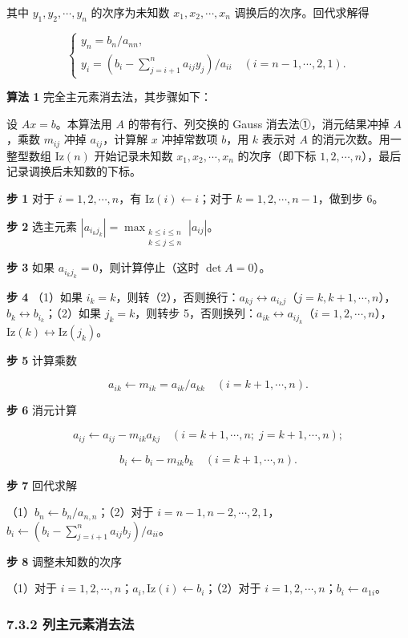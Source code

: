 \documentclass[
  10pt,
  fontset=fandol]{ctexart}
\begin{document}
其中 \(y_1,y_2,\cdots,y_n\) 的次序为未知数 \(x_1,x_2,\cdots,x_n\) 调换后的次序。回代求解得

\[
\begin{cases}
y_n=b_n/a_{nn},\\
y_i=\displaystyle\left(b_i-\sum_{j=i+1}^{n}a_{ij}y_j\right)/a_{ii}\quad(i=n-1,\cdots,2,1).
\end{cases}
\]

\textbf{算法 1} 完全主元素消去法，其步骤如下：

设 \(Ax=b\)。本算法用 \(A\) 的带有行、列交换的 Gauss 消去法①，消元结果冲掉 \(A\)，乘数 \(m_{ij}\) 冲掉 \(a_{ij}\)，计算解 \(x\) 冲掉常数项 \(b\)，用 \(k\) 表示对 \(A\) 的消元次数。用一整型数组 \(\mathrm{Iz}(n)\) 开始记录未知数 \(x_1,x_2,\cdots,x_n\) 的次序（即下标 \(1,2,\cdots,n\)），最后记录调换后未知数的下标。

\textbf{步 1} 对于 \(i=1,2,\cdots,n\)，有 \(\mathrm{Iz}(i)\leftarrow i\)；对于 \(k=1,2,\cdots,n-1\)，做到步 6。

\textbf{步 2} 选主元素 \(|a_{i_kj_k}|=\max_{\substack{k\le i\le n\\k\le j\le n}}|a_{ij}|\)。

\textbf{步 3} 如果 \(a_{i_kj_k}=0\)，则计算停止（这时 \(\det A=0\)）。

\textbf{步 4} （1）如果 \(i_k=k\)，则转（2），否则换行：\(a_{kj}\leftrightarrow a_{i_kj}\)（\(j=k,k+1,\cdots,n\)），\(b_k\leftrightarrow b_{i_k}\)；（2）如果 \(j_k=k\)，则转步 5，否则换列：\(a_{ik}\leftrightarrow a_{ij_k}\)（\(i=1,2,\cdots,n\)），\(\mathrm{Iz}(k)\leftrightarrow\mathrm{Iz}(j_k)\)。

\textbf{步 5} 计算乘数

\[a_{ik}\leftarrow m_{ik}=a_{ik}/a_{kk}\quad(i=k+1,\cdots,n).\]

\textbf{步 6} 消元计算

\[a_{ij}\leftarrow a_{ij}-m_{ik}a_{kj}\quad(i=k+1,\cdots,n;\;j=k+1,\cdots,n);\]

\[b_i\leftarrow b_i-m_{ik}b_k\quad(i=k+1,\cdots,n).\]

\textbf{步 7} 回代求解

（1）\(b_n\leftarrow b_n/a_{n,n}\)；（2）对于 \(i=n-1,n-2,\cdots,2,1\)，\(b_i\leftarrow\left(b_i-\sum_{j=i+1}^{n}a_{ij}b_j\right)/a_{ii}\)。

\textbf{步 8} 调整未知数的次序

（1）对于 \(i=1,2,\cdots,n\)；\(a_i,\mathrm{Iz}(i)\leftarrow b_i\)；（2）对于 \(i=1,2,\cdots,n\)；\(b_i\leftarrow a_{1i}\)。

\subsubsection{7.3.2 列主元素消去法}\label{ux5217ux4e3bux5143ux7d20ux6d88ux53bbux6cd5}
\end{document}
